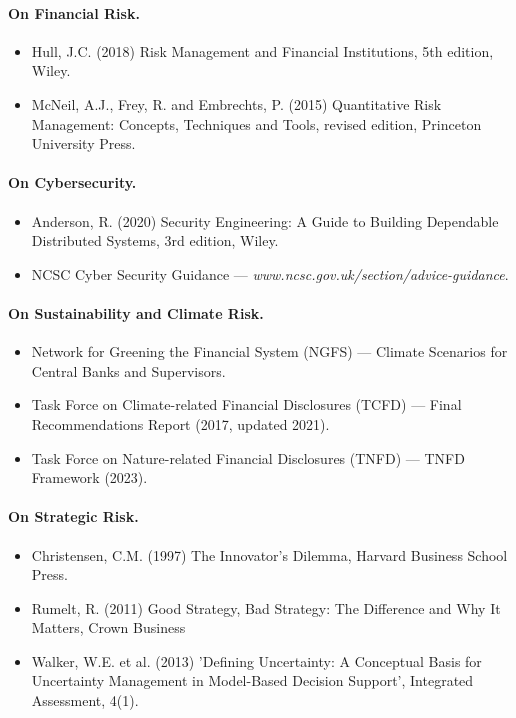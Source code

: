 \paragraph{\textbf{On Financial Risk}.}
\begin{itemize}
  \item{Hull, J.C. (2018) Risk Management and Financial Institutions, 5th edition, Wiley.}
  \item{McNeil, A.J., Frey, R. and Embrechts, P. (2015) Quantitative Risk Management: Concepts, Techniques and Tools, revised edition, Princeton University Press.}
\end{itemize}

\paragraph{\textbf{On Cybersecurity}.}
\begin{itemize}
  \item{Anderson, R. (2020) Security Engineering: A Guide to Building Dependable Distributed Systems, 3rd edition, Wiley.}
  \item{NCSC Cyber Security Guidance — \textit{www.ncsc.gov.uk/section/advice-guidance}.}
\end{itemize}

\paragraph{\textbf{On Sustainability and Climate Risk}.}
\begin{itemize}
  \item{Network for Greening the Financial System (NGFS) — Climate Scenarios for Central Banks and Supervisors.}
  \item{Task Force on Climate-related Financial Disclosures (TCFD) — Final Recommendations Report (2017, updated 2021).}
  \item{Task Force on Nature-related Financial Disclosures (TNFD) — TNFD Framework (2023).}
\end{itemize}

\paragraph{\textbf{On Strategic Risk}.}
\begin{itemize}
  \item{Christensen, C.M. (1997) The Innovator's Dilemma, Harvard Business School Press.}
  \item{Rumelt, R. (2011) Good Strategy, Bad Strategy: The Difference and Why It Matters, Crown Business}
  \item{Walker, W.E. et al. (2013) 'Defining Uncertainty: A Conceptual Basis for Uncertainty Management in Model-Based Decision Support', Integrated Assessment, 4(1).}
\end{itemize}

